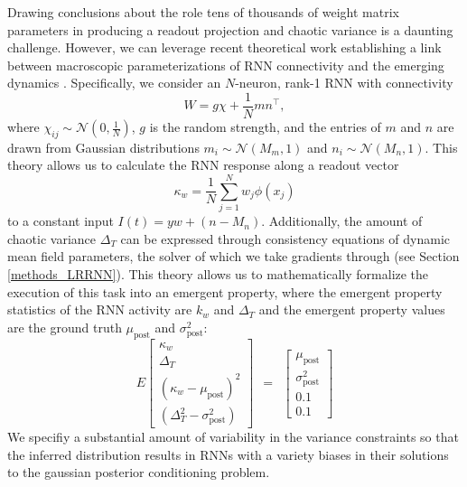 \documentclass[11pt]{article}
\begin{document}
Drawing conclusions about the role tens of thousands of weight matrix parameters in producing a readout projection and chaotic variance is a daunting challenge.  However, we can leverage recent theoretical work establishing a link between macroscopic parameterizations of RNN connectivity and the emerging dynamics \cite{mastrogiuseppe2018linking}.  Specifically, we consider an $N$-neuron, rank-1 RNN with connectivity
\begin{equation}
W = g\chi + \frac{1}{N}mn^\top,
\end{equation}
where $\chi_{ij} \sim \mathcal{N}(0, \frac{1}{N})$, $g$ is the random strength, and the entries of $m$ and $n$ are drawn from Gaussian distributions $m_i \sim \mathcal{N}(M_m, 1)$ and $n_i \sim \mathcal{N}(M_n, 1)$.  
This theory allows us to calculate the RNN response along a readout vector 
\begin{equation}
\kappa_w =  \frac{1}{N} \sum_{j=1}^N w_j \phi(x_j)
\end{equation}
to a constant input $I(t) = y w + (n-M_n)$.  Additionally, the amount of chaotic variance $\Delta_T$ can be expressed through consistency equations of dynamic mean field parameters, the solver of which we take gradients through (see Section \ref{methods_LRRNN}).
This theory allows us to mathematically formalize the execution of this task into an emergent property, where the emergent property statistics of the RNN activity are $k_w$ and $\Delta_T$ and the emergent property values are the ground truth $\mu_{\text{post}}$ and $\sigma^2_{\text{post}}$:
\begin{equation}
E \begin{bmatrix} \kappa_w \\ \Delta_T \\ (\kappa_w-\mu_{\text{post}})^2 \\ (\Delta_T^2-\sigma^2_{\text{post}}) \end{bmatrix} ~~=~~ \begin{bmatrix} \mu_{\text{post}} \\ \sigma^2_{\text{post}} \\ 0.1 \\ 0.1 \end{bmatrix}
\end{equation}
We specifiy a substantial amount of variability in the variance constraints  so that the inferred distribution results in RNNs with a variety biases in their solutions to the gaussian posterior conditioning problem. 
\end{document}
